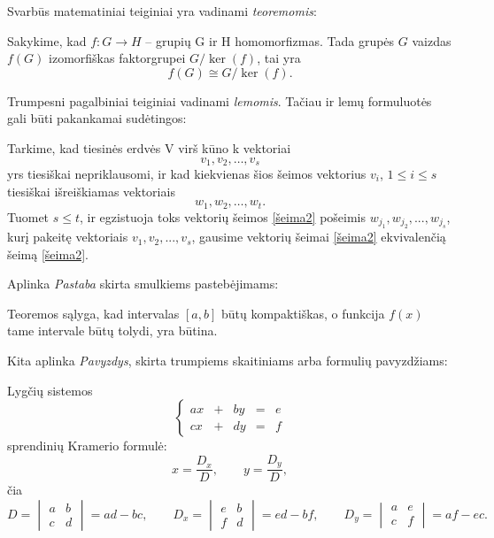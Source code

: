 \documentclass[]{VUMIFTemplateClass}
\begin{document}
\noindent  Svarbūs matematiniai teiginiai yra vadinami \emph{teoremomis}:
\begin{theorem}\label{teor1}
    Sakykime, kad $f: G {\rightarrow} H$ – grupių G ir H homomorfizmas. Tada grupės $G$ vaizdas $f(G)$ izomorfiškas faktorgrupei $G / \ker{(f)}$, tai yra
    \[
        f(G) \cong G \big / \ker{(f)}.
    \]
\end{theorem}

\noindent Trumpesni pagalbiniai teiginiai vadinami \emph{lemomis}. Tačiau ir lemų formuluotės gali būti pakankamai sudėtingos:
\begin{lemma}\label{lem1}
    Tarkime, kad tiesinės erdvės V virš kūno k vektoriai
    \begin{equation}\label{šeima1}
        v_1, v_2, \dots, v_s
    \end{equation}
    yrs tiesiškai nepriklausomi, ir kad kiekvienas šios šeimos vektorius $v_i$, $1 \leq i \leq s$ tiesiškai išreiškiamas vektoriais
    \begin{equation}\label{šeima2}
        w_1, w_2, \dots, w_t.
    \end{equation}
    Tuomet $s \leq t$, ir egzistuoja toks vektorių šeimos \eqref{šeima2} pošeimis $w_{j_1}, w_{j_2} ,  . . . , w_{j_s}$, kurį pakeitę vektoriais $v_1, v_2, . . . , v_s$, gausime vektorių šeimai \eqref{šeima2} ekvivalenčią šeimą \eqref{šeima2}.
\end{lemma}

\noindent Aplinka \emph{Pastaba} skirta smulkiems pastebėjimams:

\begin{remark}
Teoremos sąlyga, kad intervalas $[a, b]$ būtų kompaktiškas, o funkcija $f(x)$ tame intervale būtų tolydi, yra būtina.
\end{remark}

\noindent Kita aplinka \emph{Pavyzdys}, skirta trumpiems skaitiniams arba formulių pavyzdžiams:

\begin{example}
Lygčių sistemos
\[
\left\{
\begin{array}{rclcl}
    ax & + & by & = & e\\
    cx & + & dy & = & f
\end{array}
\right.
\]
sprendinių Kramerio formulė:
\[
x = \frac{D_{x}}{D}, \qquad y = \frac{D_{y}}{D},\]
čia
\[
D=
\begin{vmatrix}
a & b\\
c & d    
\end{vmatrix}=ad-bc, \qquad
D_x=
\begin{vmatrix}
e & b\\
f & d    
\end{vmatrix}=ed-bf, \qquad
D_y=
\begin{vmatrix}
a & e\\
c & f    
\end{vmatrix}=af-ec.
\]
\end{example}
\end{document}
